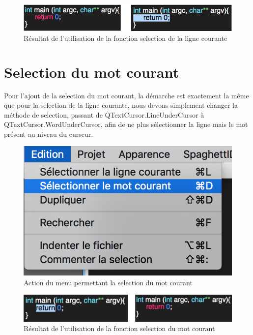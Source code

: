 \documentclass[a4paper,12pt]{article}
\begin{document}
	\begin{figure}[h!]
		\begin{center}
			\includegraphics[scale=0.8]{imgs/resultat_selection_ligne}
			\caption{Résultat de l'utilisation de la fonction selection de la ligne courante}
		\end{center}
	\end{figure}

\section{Selection du mot courant}

	Pour l'ajout de la selection du mot courant, la démarche est exactement la même que pour la selection de la ligne courante, nous devons simplement changer la méthode de selection, passant de QTextCursor.LineUnderCursor à QTextCursor.WordUnderCursor, afin de ne plus sélectionner la ligne mais le mot présent au niveau du curseur. 

	\newpage{}

	\begin{figure}[h!]
		\begin{center}
			\includegraphics[scale=0.8]{imgs/utilisation_selection_mot}
			\caption{Action du menu permettant la selection du mot courant}
		\end{center}
	\end{figure}

	\begin{figure}[h!]
		\begin{center}
			\includegraphics[scale=0.8]{imgs/resultat_selection_mot}
			\caption{Résultat de l'utilisation de la fonction selection du mot courant}
		\end{center}
	\end{figure}
\end{document}
